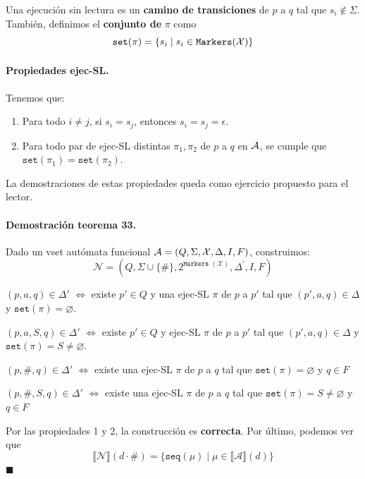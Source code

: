 Una ejecución sin lectura es un \textbf{camino de transiciones} de $p$ a $q$ tal que $s_i \notin \Sigma$. También, definimos el \textbf{conjunto de} $\pi$ como
$$
    \texttt{set}(\pi) = \{ s_i \mid s_i \in \texttt{Markers}(\mathcal{X})\}
$$

\paragraph{Propiedades ejec-SL.} Tenemos que:
\begin{enumerate}
    \item Para todo $i \neq j$, si $s_i = s_j$, entonces $s_i = s_j = \epsilon$.
    \item Para todo par de ejec-SL distintas $\pi_1, \pi_2$ de $p$ a $q$ en $\mathcal{A}$, se cumple que $\texttt{set}(\pi_1) = \texttt{set}(\pi_2)$.
\end{enumerate}

La demostraciones de estas propiedades queda como ejercicio propuesto para el lector.

\newpage

\paragraph{Demostración teorema 33.} Dado un vset autómata funcional $\mathcal{A} = (Q, \Sigma, \mathcal{X}, \Delta, I, F)$, construimos:
$$
    \mathcal{N}=\left(Q, \Sigma \cup\{\#\}, 2^{\texttt{Markers }(\mathcal{X})}, \Delta^{\prime}, I, F\right)
$$
\begin{multicols}{2}
    $(p,a,q) \in \Delta'$ $\Leftrightarrow$ existe $p' \in Q$ y una ejec-SL $\pi$ de $p$ a $p'$ tal que $(p',a,q) \in \Delta$ y $\texttt{set}(\pi) = \varnothing$.

    $(p,a,S,q) \in \Delta'$ $\Leftrightarrow$ existe $p' \in Q$ y ejec-SL $\pi$ de $p$ a $p'$ tal que $(p',a,q) \in \Delta$ y $\texttt{set}(\pi) = S \neq \varnothing$.

    $(p,\#, q) \in \Delta'$ $\Leftrightarrow$ existe una ejec-SL $\pi$ de $p$ a $q$ tal que $\texttt{set}(\pi)=\varnothing$ y $q \in F$

    $(p,\#, S, q) \in \Delta'$ $\Leftrightarrow$ existe una ejec-SL $\pi$ de $p$ a $q$ tal que $\texttt{set}(\pi)=S \neq \varnothing$ y $q \in F$
\end{multicols}
Por las propiedades 1 y 2, la construcción es \textbf{correcta}. Por último, podemos ver que
$$
    \llbracket \mathcal{N} \rrbracket(d \cdot \#)=\{\texttt{seq}(\mu) \mid \mu \in \llbracket \mathcal{A} \rrbracket(d)\}
$$
\hfill $\blacksquare$

